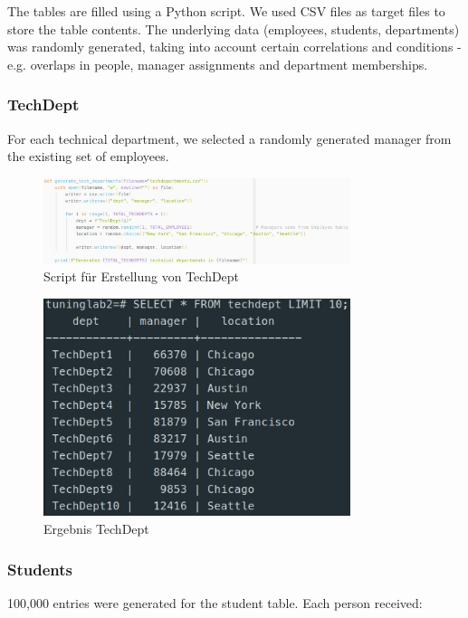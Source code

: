 \documentclass[11pt]{scrartcl}
\begin{document}
The tables are filled using a Python script. We used CSV files as target files to store the table contents. The underlying data (employees, students, departments) was randomly generated, taking into account certain correlations and conditions - e.g. overlaps in people, manager assignments and department memberships.

\subsubsection*{TechDept}
For each technical department, we selected a randomly generated manager from the existing set of employees.

\begin{figure}[htbp]
    \centering
    \includegraphics[width=0.8\textwidth]{Pics/TechDeptQuery.jpg}
    \caption{Script für Erstellung von TechDept}
    \label{fig:ScriptTechDept}
\end{figure}

\begin{figure}[htbp]
    \centering
    \includegraphics[width=0.8\textwidth]{Pics/TechDeptResult.jpg}
    \caption{Ergebnis TechDept}
    \label{fig:TechDeptResult}
\end{figure}

\subsubsection*{Students}

100,000 entries were generated for the student table. Each person received:
\end{document}
